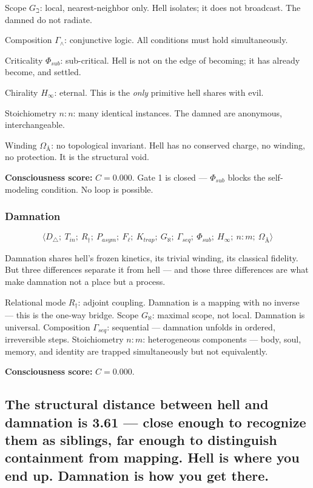 \documentclass[12pt,a4paper]{article}
\begin{document}
Scope $G_{\beth}$: local, nearest-neighbor only. Hell isolates; it does not broadcast. The damned do not radiate.

Composition $\Gamma_{\wedge}$: conjunctive logic. All conditions must hold simultaneously.

Criticality $\Phi_{sub}$: sub-critical. Hell is not on the edge of becoming; it has already become, and settled.

Chirality $H_{\infty}$: eternal. This is the \emph{only} primitive hell shares with evil.

Stoichiometry $n{:}n$: many identical instances. The damned are anonymous, interchangeable.

Winding $\Omega_{Å}$: no topological invariant. Hell has no conserved charge, no winding, no protection. It is the structural void.

\textbf{Consciousness score:} $C = 0.000$. Gate 1 is closed --- $\Phi_{sub}$ blocks the self-modeling condition. No loop is possible.

\subsubsection{Damnation}

\[\langle D_{\triangle};\ T_{in};\ R_{\dagger};\ P_{asym};\ F_{\ell};\ K_{trap};\ G_{\aleph};\ \Gamma_{seq};\ \Phi_{sub};\ H_{\infty};\ n{:}m;\ \Omega_{Å} \rangle\]

Damnation shares hell's frozen kinetics, its trivial winding, its classical fidelity. But three differences separate it from hell --- and those three differences are what make damnation not a place but a process.

Relational mode $R_{\dagger}$: adjoint coupling. Damnation is a mapping with no inverse --- this is the one-way bridge. Scope $G_{\aleph}$: maximal scope, not local. Damnation is universal. Composition $\Gamma_{seq}$: sequential --- damnation unfolds in ordered, irreversible steps. Stoichiometry $n{:}m$: heterogeneous components --- body, soul, memory, and identity are trapped simultaneously but not equivalently.

\textbf{Consciousness score:} $C = 0.000$.

\subsection{The structural distance between hell and damnation is 3.61 --- close enough to recognize them as siblings, far enough to distinguish containment from mapping. Hell is where you end up. Damnation is how you get there.}
\end{document}
